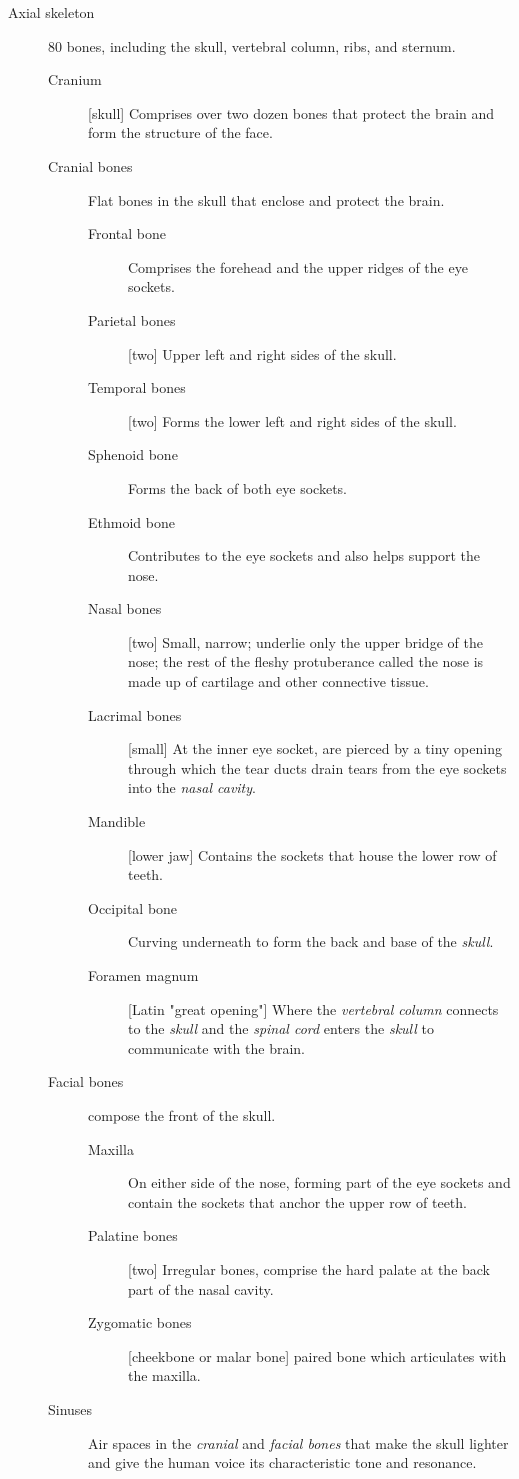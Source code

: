 \documentclass[11pt]{article}
\begin{document}
\begin{description}
\item[{Axial skeleton}] 80 bones, including the skull, vertebral column, ribs,
and sternum.
\begin{description}
\item[{Cranium}] [skull] Comprises over two dozen bones that protect the brain and
form the structure of the face.
\item[{Cranial bones}] Flat bones in the skull that enclose and protect the brain.
\begin{description}
\item[{Frontal bone}] Comprises the forehead and the upper ridges of the eye
sockets.
\item[{Parietal bones}] [two] Upper left and right sides of the skull.
\item[{Temporal bones}] [two] Forms the lower left and right sides of the skull.
\item[{Sphenoid bone}] Forms the back of both eye sockets.
\item[{Ethmoid bone}] Contributes to the eye sockets and also helps support the
nose.
\item[{Nasal bones}] [two] Small, narrow; underlie only the upper bridge of the
nose; the rest of the fleshy protuberance called the nose is made up of
cartilage and other connective tissue.
\item[{Lacrimal bones}] [small] At the inner eye socket, are pierced by a tiny
opening through which the tear ducts drain tears from the eye sockets
into the \emph{nasal cavity}.
\item[{Mandible}] [lower jaw] Contains the sockets that house the lower row of
teeth.
\item[{Occipital bone}] Curving underneath to form the back and base of the
\emph{skull}.
\item[{Foramen magnum}] [Latin "great opening"] Where the \emph{vertebral column}
connects to the \emph{skull} and the \emph{spinal cord} enters the \emph{skull} to
communicate with the brain.
\end{description}
\item[{Facial bones}] compose the front of the skull.
\begin{description}
\item[{Maxilla}] On either side of the nose, forming part of the eye sockets and
contain the sockets that anchor the upper row of teeth.
\item[{Palatine bones}] [two] Irregular bones, comprise the hard palate at
the back part of the nasal cavity.
\item[{Zygomatic bones}] [cheekbone or malar bone] paired bone which
articulates with the maxilla.
\end{description}
\item[{Sinuses}] Air spaces in the \emph{cranial} and \emph{facial bones} that make the
skull lighter and give the human voice its characteristic tone and
resonance.


\end{description}
\end{description}
\end{document}
